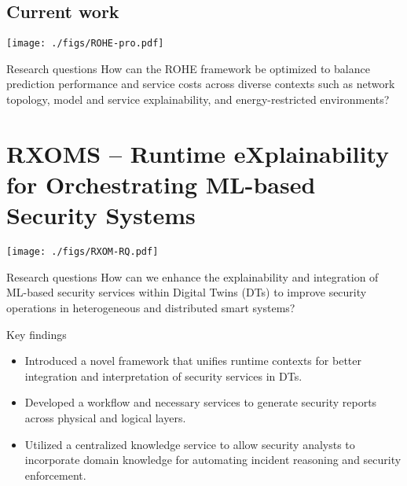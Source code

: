 \documentclass[landscape,a0,final]{a0poster} %
\newcommand{\sectionspace}{10mm} %
\newcommand{\figurespace}{10mm} %
\begin{document}
\begin{minipage}{0.98\linewidth}
\begin{minipage}[t]{0.3\linewidth}
\subsection*{Current work}
\texttt{[image: ./figs/ROHE-pro.pdf]}
\begin{myframe}{Research questions}
    How can the ROHE framework be optimized to balance prediction performance and service costs across diverse contexts such as network topology, model and service explainability, and energy-restricted environments?
\end{myframe}

\end{minipage}
\hspace{0.03\linewidth} %
\begin{minipage}[t]{0.3\linewidth}
\setlength{\parindent}{10mm} %
\vspace{\sectionspace}
\section{RXOMS -- Runtime eXplainability for Orchestrating ML-based Security Systems}
\vspace{-30pt}
\begin{center}
\texttt{[image: ./figs/RXOM-RQ.pdf]}
\end{center}
\begin{myframe}{Research questions}
  How can we enhance the explainability and integration of ML-based security services within Digital Twins (DTs) to improve security operations in heterogeneous and distributed smart systems?
\end{myframe}
\begin{myframe}{Key findings}
\begin{itemize}
    \item Introduced a novel framework that unifies runtime contexts for better integration and interpretation of security services in DTs.
    \item Developed a workflow and necessary services to generate security reports across physical and logical layers.
    \item Utilized a centralized knowledge service to allow security analysts to incorporate domain knowledge for automating incident reasoning and security enforcement.
\end{itemize}
\end{myframe}


\end{minipage}
\end{minipage}
\end{document}
